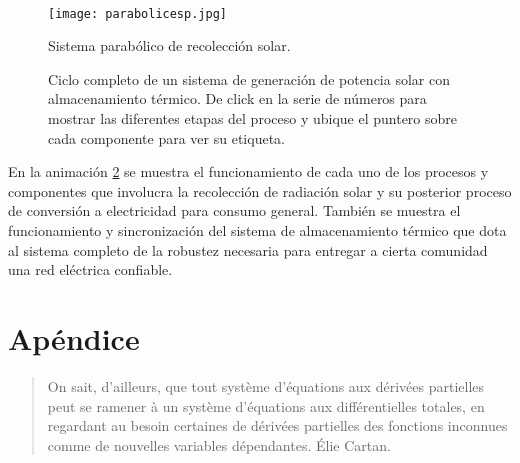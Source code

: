 \documentclass{article}
\theoremstyle{definition} \newtheorem{defi}{Definici\'on}
\theoremstyle{definition} \newtheorem{teo}{Teorema}
\theoremstyle{definition} \newtheorem{cor}{Corolario}
\begin{document}
\paragraph{}
\begin{figure}[t!]
\centering
\texttt{[image: parabolicesp.jpg]}
\caption{Sistema parab\'olico de recolecci\'on solar.}
\label{paraboliesp}
\end{figure}

\begin{figure}[t!]
\caption{Ciclo completo de un sistema de generaci\'on de potencia solar con almacenamiento t\'ermico. De click en la serie de n\'umeros para mostrar las diferentes etapas del proceso y ubique el puntero sobre cada componente para ver su etiqueta.}
\label{anima}
\end{figure}
En la animaci\'on \ref{anima} se muestra el funcionamiento de cada uno de los procesos y componentes que involucra la recolecci\'on de radiaci\'on solar y su posterior proceso de conversi\'on a electricidad para consumo general. Tambi\'en se muestra el funcionamiento y sincronizaci\'on del sistema de almacenamiento t\'ermico que dota al sistema completo de la robustez necesaria para entregar a cierta comunidad una red el\'ectrica confiable.

\appendix
\section{Ap\'endice}
\begin{quote}
On sait, d'ailleurs, que tout syst\`eme d'\'equations aux d\'eriv\'ees partielles peut se ramener \`a un syst\`eme d'\'equations aux diff\'erentielles totales, en regardant au besoin certaines de d\'eriv\'ees partielles des fonctions inconnues comme de nouvelles variables d\'ependantes. \'Elie Cartan.
\end{quote}
\end{document}
